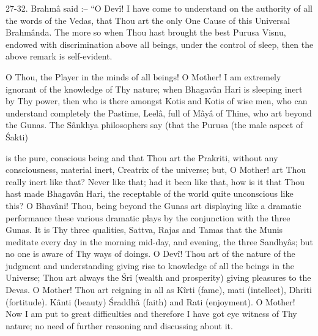 27-32. Brahm\^a said :-- ``O Dev\^i! I have come to understand on the authority of all the words of the Vedas, that Thou art the only One Cause of this Universal Brahm\^anda. The more so when Thou hast brought the best Purusa Visnu, endowed with discrimination above all beings, under the control of sleep, then the above remark is self-evident.

O Thou, the Player in the minds of all beings! O Mother! I am extremely ignorant of the knowledge of Thy nature; when Bhagav\^an Hari is sleeping inert by Thy power, then who is there amongst Kotis and Kotis of wise men, who can understand completely the Pastime, Leel\^a, full of M\^ay\^a of Thine, who art beyond the Gunas. The S\^ankhya philosophers say (that the Purusa (the male aspect of \'Sakti)

is the pure, conscious being and that Thou art the Prakriti, without any consciousness, material inert, Creatrix of the universe; but, O Mother! art Thou really inert like that? Never like that; had it been like that, how is it that Thou hast made Bhagav\^an Hari, the receptable of the world quite unconscious like this? O Bhav\^ani! Thou, being beyond the Gunas art displaying like a dramatic performance these various dramatic plays by the conjunction with the three Gunas. It is Thy three qualities, Sattva, Rajas and Tamas that the Munis meditate every day in the morning mid-day, and evening, the three Sandhy\^as; but no one is aware of Thy ways of doings. O Dev\^i! Thou art of the nature of the judgment and understanding giving rise to knowledge of all the beings in the Universe; Thou art always the \'Sri (wealth and prosperity) giving pleasures to the Devas. O Mother! Thou art reigning in all as K\^irti (fame), mati (intellect), Dhriti (fortitude). K\^anti (beauty) \'Sraddh\^a (faith) and Rati (enjoyment). O Mother! Now I am put to great difficulties and therefore I have got eye witness of Thy nature; no need of further reasoning and discussing about it.


